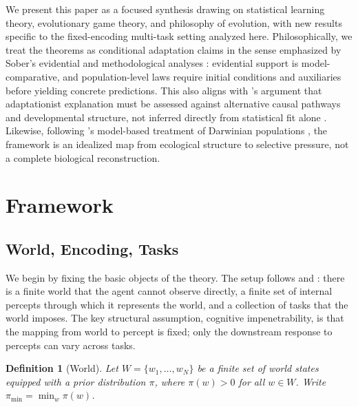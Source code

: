 \documentclass[12pt]{article}
\newtheorem{definition}[theorem]{Definition}
\newcommand{\pimin}{\pi_{\min}}
\begin{document}
We present this paper as a focused synthesis drawing on statistical learning theory, evolutionary game theory, and philosophy of evolution, with new results specific to the fixed-encoding multi-task setting analyzed here. Philosophically, we treat the theorems as conditional adaptation claims in the sense emphasized by Sober's evidential and methodological analyses \citep{sober_2008,sober_2024}: evidential support is model-comparative, and population-level laws require initial conditions and auxiliaries before yielding concrete predictions. This also aligns with \citeauthor{pigliucci_kaplan_2006}'s argument that adaptationist explanation must be assessed against alternative causal pathways and developmental structure, not inferred directly from statistical fit alone \citep[prelude; chs.~2 and~5]{pigliucci_kaplan_2006}. Likewise, following \citeauthor{godfreysmith_2009}'s model-based treatment of Darwinian populations \citep{godfreysmith_2009,godfreysmith_2024}, the framework is an idealized map from ecological structure to selective pressure, not a complete biological reconstruction.

\section{Framework}\label{sec:framework}

\subsection{World, Encoding, Tasks}\label{sec:world}

We begin by fixing the basic objects of the theory. The setup follows \citet{hoffman_etal_2015} and \citet{berke_etal_2022}: there is a finite world that the agent cannot observe directly, a finite set of internal percepts through which it represents the world, and a collection of tasks that the world imposes. The key structural assumption, cognitive impenetrability, is that the mapping from world to percept is fixed; only the downstream response to percepts can vary across tasks.

\begin{definition}[World]\label{def:world}
Let $W = \{w_1, \ldots, w_N\}$ be a finite set of \emph{world states} equipped with a prior distribution $\pi$, where $\pi(w) > 0$ for all $w \in W$. Write $\pimin = \min_w \pi(w)$.
\end{definition}
\end{document}
